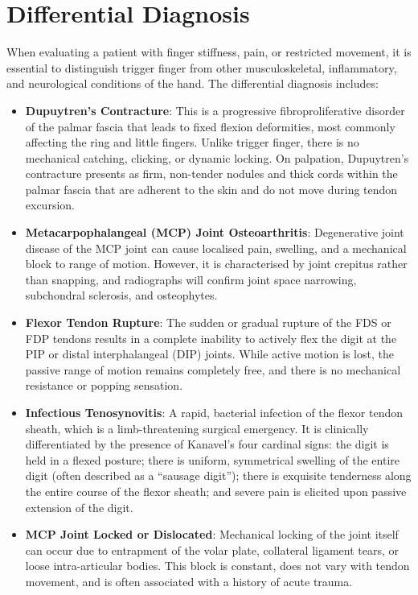 \section*{Differential Diagnosis}
When evaluating a patient with finger stiffness, pain, or restricted movement, it is essential to distinguish trigger finger from other musculoskeletal, inflammatory, and neurological conditions of the hand. The differential diagnosis includes:

\begin{itemize}
  \item \textbf{Dupuytren's Contracture}: This is a progressive fibroproliferative disorder of the palmar fascia that leads to fixed flexion deformities, most commonly affecting the ring and little fingers. Unlike trigger finger, there is no mechanical catching, clicking, or dynamic locking. On palpation, Dupuytren's contracture presents as firm, non-tender nodules and thick cords within the palmar fascia that are adherent to the skin and do not move during tendon excursion.
  \item \textbf{Metacarpophalangeal (MCP) Joint Osteoarthritis}: Degenerative joint disease of the MCP joint can cause localised pain, swelling, and a mechanical block to range of motion. However, it is characterised by joint crepitus rather than snapping, and radiographs will confirm joint space narrowing, subchondral sclerosis, and osteophytes.
  \item \textbf{Flexor Tendon Rupture}: The sudden or gradual rupture of the FDS or FDP tendons results in a complete inability to actively flex the digit at the PIP or distal interphalangeal (DIP) joints. While active motion is lost, the passive range of motion remains completely free, and there is no mechanical resistance or popping sensation.
  \item \textbf{Infectious Tenosynovitis}: A rapid, bacterial infection of the flexor tendon sheath, which is a limb-threatening surgical emergency. It is clinically differentiated by the presence of Kanavel's four cardinal signs: the digit is held in a flexed posture; there is uniform, symmetrical swelling of the entire digit (often described as a ``sausage digit''); there is exquisite tenderness along the entire course of the flexor sheath; and severe pain is elicited upon passive extension of the digit.
  \item \textbf{MCP Joint Locked or Dislocated}: Mechanical locking of the joint itself can occur due to entrapment of the volar plate, collateral ligament tears, or loose intra-articular bodies. This block is constant, does not vary with tendon movement, and is often associated with a history of acute trauma.

\end{itemize}

